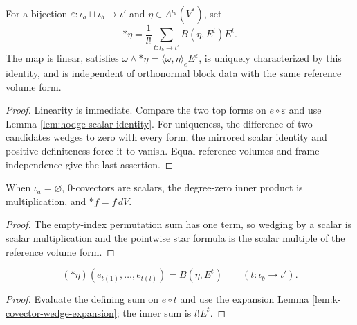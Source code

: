 \begin{proposition}
\label{prop:hodge-star-pointwise}





For a bijection $\varepsilon:\iota_a\sqcup\iota_b\to\iota'$ and $\eta\in\Lambda^{\iota_a}(V^*)$, set
\[
{*}\eta=\frac1{l!}\sum_{t:\iota_b\to\iota'}B(\eta,E^t)E^t.
\]
The map is linear, satisfies $\omega\wedge {*}\eta=\langle\omega,\eta\rangle_eE^\varepsilon$, is uniquely characterized by this identity, and is independent of orthonormal block data with the same reference volume form.
\end{proposition}
\begin{proof}

\sketch Linearity is immediate. Compare the two top forms on $e\circ\varepsilon$ and use Lemma \ref{lem:hodge-scalar-identity}. For uniqueness, the difference of two candidates wedges to zero with every form; the mirrored scalar identity and positive definiteness force it to vanish. Equal reference volumes and frame independence give the last assertion.
\end{proof}

\begin{proposition}
\label{prop:hodge-star-degree-zero}





When $\iota_a=\varnothing$, $0$-covectors are scalars, the degree-zero inner product is multiplication, and $*f=f\,dV$.
\end{proposition}
\begin{proof}

\sketch The empty-index permutation sum has one term, so wedging by a scalar is scalar multiplication and the pointwise star formula is the scalar multiple of the reference volume form.
\end{proof}

\begin{lemma}
\label{lem:hodge-star-reproducing}





\[
({*}\eta)(e_{t(1)},\ldots,e_{t(l)})=B(\eta,E^t)\qquad(t:\iota_b\to\iota').
\]
\end{lemma}
\begin{proof}

\sketch Evaluate the defining sum on $e\circ t$ and use the expansion Lemma \ref{lem:k-covector-wedge-expansion}; the inner sum is $l!E^t$.
\end{proof}

